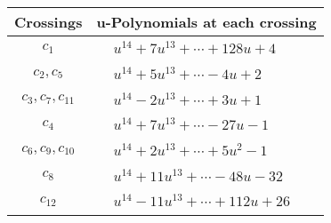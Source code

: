 \documentclass[1p]{elsarticle_modified}
\theoremstyle{definition}
\begin{document}
\begin{tabular}{m{50pt}|m{274pt}}
Crossings & \hspace{64pt}u-Polynomials at each crossing \\
\hline $$\begin{aligned}c_{1}\end{aligned}$$&$\begin{aligned}
&u^{14}+7 u^{13}+\cdots+128 u+4
\end{aligned}$\\
\hline $$\begin{aligned}c_{2},c_{5}\end{aligned}$$&$\begin{aligned}
&u^{14}+5 u^{13}+\cdots-4 u+2
\end{aligned}$\\
\hline $$\begin{aligned}c_{3},c_{7},c_{11}\end{aligned}$$&$\begin{aligned}
&u^{14}-2 u^{13}+\cdots+3 u+1
\end{aligned}$\\
\hline $$\begin{aligned}c_{4}\end{aligned}$$&$\begin{aligned}
&u^{14}+7 u^{13}+\cdots-27 u-1
\end{aligned}$\\
\hline $$\begin{aligned}c_{6},c_{9},c_{10}\end{aligned}$$&$\begin{aligned}
&u^{14}+2 u^{13}+\cdots+5 u^2-1
\end{aligned}$\\
\hline $$\begin{aligned}c_{8}\end{aligned}$$&$\begin{aligned}
&u^{14}+11 u^{13}+\cdots-48 u-32
\end{aligned}$\\
\hline $$\begin{aligned}c_{12}\end{aligned}$$&$\begin{aligned}
&u^{14}-11 u^{13}+\cdots+112 u+26
\end{aligned}$\\
\hline
\end{tabular}\\~\\
\newpage\renewcommand{\arraystretch}{1}
\end{document}
